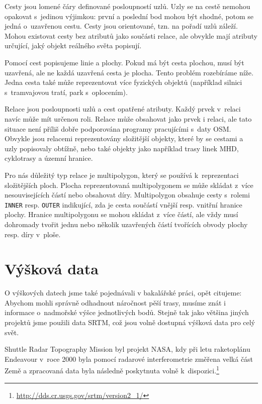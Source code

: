 {\tuc Cesty} jsou lomené čáry definované posloupností uzlů. Uzly se na cestě nemohou opakovat
s~jedinou výjimkou: první a poslední bod mohou být shodné, potom se jedná
o~uzavřenou cestu. Cesty jsou orientované, tzn. na pořadí uzlů záleží. Mohou
existovat cesty bez atributů jako součásti relace, ale obvykle mají atributy
určující, jaký objekt reálného světa popisují.

Pomocí cest popisujeme linie a plochy. Pokud má být cesta plochou, musí být
uzavřená, ale ne každá uzavřená cesta je plocha. Tento problém rozebíráme níže.
Jedna cesta také může reprezentovat více fyzických objektů (například silnici
s~tramvajovou tratí, park s~oplocením).

{\tuc Relace} jsou posloupnosti uzlů a cest opatřené atributy. Každý prvek
v~relaci navíc může mít určenou roli. Relace může obsahovat jako prvek i relaci,
ale tato situace není příliš dobře podporována programy pracujícími s~daty OSM. 
Obvykle jsou relacemi reprezentovány složitější objekty, které by se cestami a
uzly popisovaly obtížně, nebo také  objekty jako například
trasy linek MHD, cyklotrasy a územní hranice.

Pro nás důležitý typ relace je {\tuc multipolygon}, který se používá k~reprezentaci
složitějších ploch. Plocha reprezentovaná multipolygonem se může skládat z~více
nesouvisejících částí nebo obsahovat díry. Multipolygon obsahuje cesty s~rolemi 
\verb|INNER| resp. \verb|OUTER| indikující, zda je cesta součástí vnější resp.
vnitřní hranice plochy. Hranice multipolygonu se mohou skládat z~více částí, ale
vždy musí dohromady tvořit jednu nebo několik uzavřených částí tvořících obvody 
plochy resp. díry v~ploše.

\section{Výšková data}
O výškových datech jsme také pojednávali v bakalářské práci, opět
citujeme\cite{bakalarka}:
Abychom mohli správně odhadnout náročnost pěší trasy, musíme znát i informace
o~nadmořské výšce jednotlivých bodů. Stejně tak jako většina jiných projektů jsme
použili data SRTM\cite{SRTM}, což jsou volně dostupná výšková data pro celý
svět.

Shuttle Radar Topography Mission byl projekt NASA, kdy při letu raketoplánu
Endeavour v~roce 2000 byla pomocí radarové interferometrie změřena velká část
Země a zpracovaná data byla následně poskytnuta volně k~dispozici.\footnote{\url{http://dds.cr.usgs.gov/srtm/version2_1/}} 

